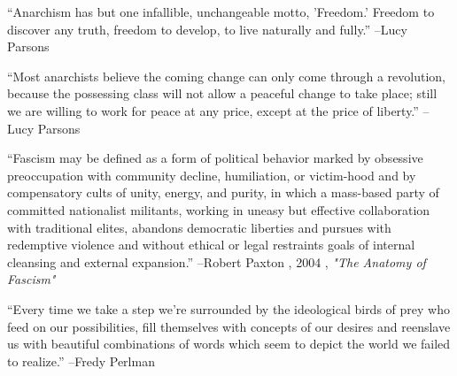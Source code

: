 \documentclass{article}%
\begin{document}
\linebreak%
\vspace{1mm}%
\begin{minipage}{\textwidth}%
\flushleft%
“Anarchism has but one infallible, unchangeable motto, 'Freedom.' Freedom to discover any truth, freedom to develop, to live naturally and fully.”%
\linebreak%
\vspace{1mm}%
–Lucy Parsons%
\linebreak%
\vspace{1mm}%
\end{minipage}%
\linebreak%
\vspace{1mm}%
\begin{minipage}{\textwidth}%
\flushleft%
“Most anarchists believe the coming change can only come through a revolution, because the possessing class will not allow a peaceful change to take place; still we are willing to work for peace at any price, except at the price of liberty.”%
\linebreak%
\vspace{1mm}%
–Lucy Parsons%
\linebreak%
\vspace{1mm}%
\end{minipage}%
\linebreak%
\vspace{1mm}%
\begin{minipage}{\textwidth}%
\flushleft%
“Fascism may be defined as a form of political behavior marked by obsessive preoccupation with community decline, humiliation, or victim{-}hood and by compensatory cults of unity, energy, and purity, in which a mass{-}based party of committed nationalist militants, working in uneasy but effective collaboration with traditional elites, abandons democratic liberties and pursues with redemptive violence and without ethical or legal restraints goals of internal cleansing and external expansion.”%
\linebreak%
\vspace{1mm}%
–Robert Paxton%
, 2004%
, \textit{"The Anatomy of Fascism"}%
\linebreak%
\vspace{1mm}%
\end{minipage}%
\linebreak%
\vspace{1mm}%
\begin{minipage}{\textwidth}%
\flushleft%
“Every time we take a step we're surrounded by the ideological birds of prey who feed on our possibilities, fill themselves with concepts of our desires and reenslave us with beautiful combinations of words which seem to depict the world we failed to realize.”%
\linebreak%
\vspace{1mm}%
–Fredy Perlman%
\linebreak%
\vspace{1mm}%
\end{minipage}%
\end{document}
